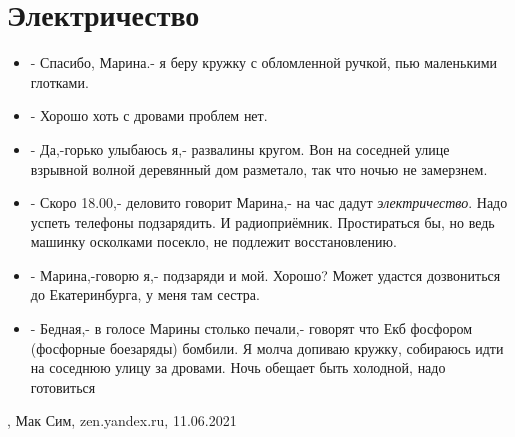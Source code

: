  
 
 
 
 
\chapter{Электричество}
\label{sec:slova.elektrichestvo}

\begin{itemize}
\item - Спасибо, Марина.- я беру кружку с обломленной ручкой, пью маленькими глотками.
\item - Хорошо хоть с дровами проблем нет.
\item - Да,-горько улыбаюсь я,- развалины кругом. Вон на соседней улице взрывной волной деревянный дом разметало, так что ночью не замерзнем.
\item - Скоро 18.00,- деловито говорит Марина,- на час дадут \emph{электричество}. Надо успеть телефоны подзарядить. И радиоприёмник. Простираться бы, но ведь машинку осколками посекло, не подлежит восстановлению.
\item - Марина,-говорю я,- подзаряди и мой. Хорошо? Может удастся дозвониться до Екатеринбурга, у меня там сестра.
\item - Бедная,- в голосе Марины столько печали,- говорят что Екб фосфором (фосфорные боезаряды) бомбили.
Я молча допиваю кружку, собираюсь идти на соседнюю улицу за дровами. Ночь обещает быть холодной, надо готовиться
\end{itemize}
, Мак Сим, zen.yandex.ru, 11.06.2021

